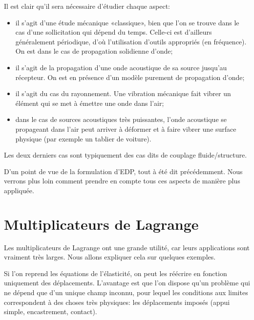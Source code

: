 \medskip
Il est clair qu'il sera nécessaire d'étudier chaque aspect:
\begin{itemize}
\item {} il s'agit d'une étude mécanique «classique», bien que l'on se trouve
	dans le cas d'une sollicitation qui dépend du temps. Celle-ci est d'ailleurs généralement
	périodique, d'où l'utilisation d'outils appropriés (en fréquence). On est dans
	le cas de propagation solidienne d'onde;
  \item {} il s'agit de la propagation d'une onde acoustique de sa source
	jusqu'au récepteur. On est en présence d'un modèle purement de propagation
	d'onde;
  \item {} il s'agit du cas du rayonnement. Une vibration mécanique fait
	vibrer un élément qui se met à émettre une onde dans l'air;
  \item {} dans le cas de sources acoustiques très puissantes, l'onde
	acoustique se propageant dans l'air peut arriver à déformer et à faire 
	vibrer une surface physique (par exemple un tablier de voiture).
\end{itemize}
Les deux derniers cas sont typiquement des cas dits de couplage fluide/structure.

\medskip
D'un point de vue de la formulation d'EDP, tout à été dit précédemment.
Nous verrons plus loin comment prendre en compte tous ces aspects de manière
plus appliquée.

\medskip
\section{Multiplicateurs de Lagrange}

Les multiplicateurs de Lagrange ont une grande utilité, car leurs applications sont
vraiment très larges.
Nous allons expliquer cela sur quelques exemples.

\medskip
Si l'on reprend les équations de l'élasticité, on peut les réécrire en fonction
uniquement des déplacements.
L'avantage est que l'on dispose qu'un problème qui ne dépend que d'un unique
champ inconnu, pour lequel les conditions aux limites correspondent à des choses 
très physiques: les déplacements imposés (appui simple, encastrement, contact).

